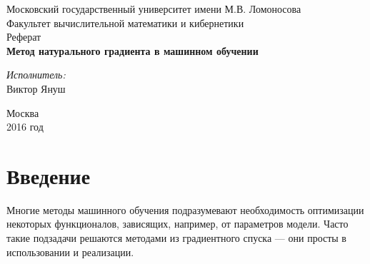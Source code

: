 \documentclass[a4paper,12pt]{article}
\begin{document}
\renewcommand{\sfdefault}{ptm}

\newcommand{\sumfromto}[3]{\overset{#2}{\underset{#1}{\sum}}{#3}}

\begin{titlepage}

\newcommand{\HRule}{\rule{\linewidth}{0.5mm}} %

\center 


\Large Московский государственный университет имени М.В. Ломоносова\\[1.5cm]
\Large Факультет вычислительной математики и кибернетики\\[0.5cm]
\large Реферат\\[0.5cm] 

{ \huge \bfseries Метод натурального градиента в машинном обучении}\\[0.4cm] %

\vspace{2cm}

\begin{flushright} \large
\Large \emph{Исполнитель:}\\
Виктор Януш\\[3cm] 
\end{flushright}

\vfill 

{\large Москва \\ 2016 год}\\[3cm]

\end{titlepage}

 
\tableofcontents
\newpage


\section{Введение}

Многие методы машинного обучения подразумевают необходимость оптимизации некоторых функционалов, зависящих, например, от параметров
модели. Часто такие подзадачи решаются методами из градиентного спуска --- они просты в использовании и реализации.
\end{document}
